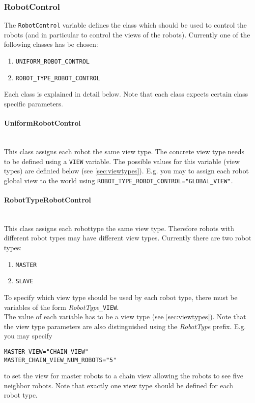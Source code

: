 \subsubsection{RobotControl}\label{sec:robotControl}
The \texttt{RobotControl} variable defines the class which should be used to control the robots (and in particular to control the views of the robots). Currently one of the following classes has be chosen:
\begin{enumerate}
	\item \texttt{UNIFORM\_ROBOT\_CONTROL}
	\item \texttt{ROBOT\_TYPE\_ROBOT\_CONTROL}
\end{enumerate}
Each class is explained in detail below. Note that each class expects certain class specific parameters.

\paragraph{UniformRobotControl}\label{sec:uniformRobotControl} \ \\
This class assigns each robot the same view type. The concrete view type needs to be defined using a \texttt{VIEW} variable. The possible values for this variable (view types) are definied below (see \ref{sec:viewtypes}). E.g. you may to assign each robot global view to the world using \texttt{ROBOT\_TYPE\_ROBOT\_CONTROL="GLOBAL\_VIEW"}.

\paragraph{RobotTypeRobotControl}\label{sec:robotTypeRobotControl} \ \\
This class assigns each robottype the same view type. Therefore robots with different robot types may have different view types. Currently there are two robot types:
\begin{enumerate}
	\item \texttt{MASTER}
	\item \texttt{SLAVE}
\end{enumerate}
To specify which view type should be used by each robot type, there must be variables of the form \textit{RobotType}\texttt{\_VIEW}. \\
The value of each variable has to be a view type (see \ref{sec:viewtypes}). Note that the view type parameters are also distinguished using the \textit{RobotType} prefix. E.g. you may specify 
\begin{center}
\texttt{MASTER\_VIEW="CHAIN\_VIEW"} \\
\texttt{MASTER\_CHAIN\_VIEW\_NUM\_ROBOTS="5"}
\end{center} to set the view for master robots to a chain view allowing the robots to see five neighbor robots. Note that exactly one view type should be defined for each robot type.

